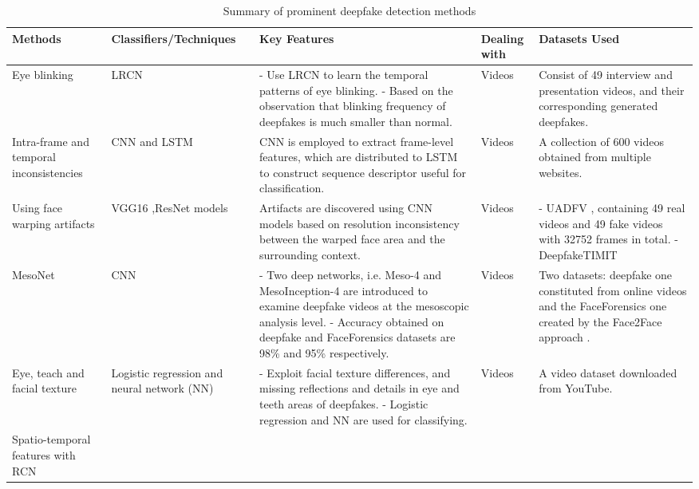 \begin{table}[h!]
\centering
\caption{Summary of prominent deepfake detection methods}
\label{table2}
\begin{scriptsize}
\begin{tabularx}{\linewidth}{p{} p{} p{} p{} p{}}
\toprule
\textbf{Methods} & \textbf{Classifiers/\newline Techniques} & \textbf{Key Features} & \textbf{Dealing with} & \textbf{Datasets Used}\\
\midrule
Eye blinking 
&LRCN
&- Use LRCN to learn the temporal patterns of eye blinking.\newline
- Based on the observation that blinking frequency of deepfakes is much smaller than normal.
&Videos
&Consist of 49 interview and presentation videos, and their corresponding generated deepfakes.\\
\hline
Intra-frame and temporal inconsistencies 
&CNN and LSTM
&CNN is employed to extract frame-level features, which are distributed to LSTM to construct sequence descriptor useful for classification.	
&Videos
&A collection of 600 videos obtained from multiple websites.\\
\hline
Using face warping artifacts 
&VGG16 ,\newline ResNet models 
&Artifacts are discovered using CNN models based on resolution inconsistency between the warped face area and the surrounding context.
&Videos
&- UADFV , containing 49 real videos and 49 fake videos with 32752 frames in total.\newline
- DeepfakeTIMIT \\
\hline
MesoNet 
&CNN
&- Two deep networks, i.e. Meso-4 and MesoInception-4 are introduced to examine deepfake videos at the mesoscopic analysis level.\newline
- Accuracy obtained on deepfake and FaceForensics datasets are 98\% and 95\% respectively.
&Videos
&Two datasets: deepfake one constituted from online videos and the FaceForensics one created by the Face2Face approach .\\
\hline
Eye, teach and facial texture 
&Logistic regression and neural network (NN)
&- Exploit facial texture differences, and missing reflections and details in eye and teeth areas of deepfakes.\newline
- Logistic regression and NN are used for classifying.	
&Videos
&A video dataset downloaded from YouTube.\\
\hline
Spatio-temporal features with RCN 

\end{tabularx}
\end{scriptsize}
\end{table}
